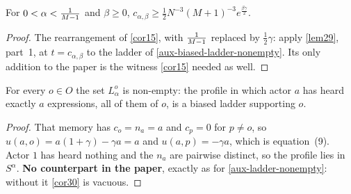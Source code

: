 \begin{corollary}
  \label{cor30}
  \leanok
  For $0 < \alpha < \tfrac{1}{M-1}$ and $\beta \ge 0$,
  $c_{\alpha,\beta} \ge \tfrac{1}{2} N^{-3}(M+1)^{-3} e^{\frac{\beta\gamma}{2}}$.
\end{corollary}
\begin{proof}
  \leanok
  The rearrangement of \ref{cor15}, with $\tfrac{1}{M-1}$ replaced by
  $\tfrac{1}{2}\gamma$: apply \ref{lem29}, part~1, at $t = c_{\alpha,\beta}$ to
  the ladder of \ref{aux-biased-ladder-nonempty}.  Its only addition to the
  paper is the witness \ref{cor15} needed as well.
\end{proof}

\begin{lemma}
  \label{aux-biased-ladder-nonempty}
  \leanok
  For every $o \in O$ the set $L_\alpha^o$ is non-empty: the profile in which
  actor $a$ has heard exactly $a$ expressions, all of them of $o$, is a biased
  ladder supporting $o$.
\end{lemma}
\begin{proof}
  \leanok
  That memory has $c_o = n_a = a$ and $c_p = 0$ for $p \ne o$, so $u(a,o) =
  a(1+\gamma) - \gamma a = a$ and $u(a,p) = -\gamma a$, which is equation~(9).
  Actor $1$ has heard nothing and the $n_a$ are pairwise distinct, so the
  profile lies in $S^\alpha$. \textbf{No counterpart in the paper}, exactly as
  for \ref{aux-ladder-nonempty}: without it \ref{cor30} is vacuous.
\end{proof}

